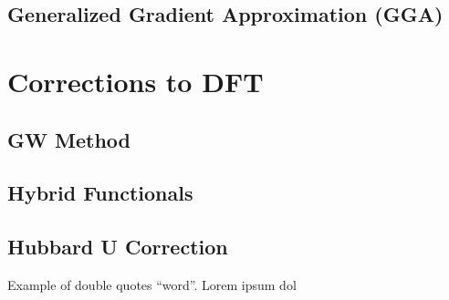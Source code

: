     \subsection{Generalized Gradient Approximation (GGA)}

\section{Corrections to DFT}
    \subsection{GW Method}
    \subsection{Hybrid Functionals}
    \subsection{Hubbard U Correction}

Example of double quotes ``word''. Lorem ipsum dol